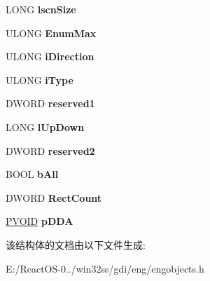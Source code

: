 \begin{DoxyCompactItemize}
\mbox{\label{struct___x_c_l_i_p_o_b_j_a49493395b035c31a73e59db873da0da6}} 
L\+O\+NG {\bfseries lscn\+Size}
\item 
\mbox{\label{struct___x_c_l_i_p_o_b_j_a582917e3993dc69ce7d884c406a0ebb5}} 
U\+L\+O\+NG {\bfseries Enum\+Max}
\item 
\mbox{\label{struct___x_c_l_i_p_o_b_j_a2e4ce570360881ee1650d0316d4ea4b3}} 
U\+L\+O\+NG {\bfseries i\+Direction}
\item 
\mbox{\label{struct___x_c_l_i_p_o_b_j_a838a00edbb482f46961d80a93dc7008d}} 
U\+L\+O\+NG {\bfseries i\+Type}
\item 
\mbox{\label{struct___x_c_l_i_p_o_b_j_a557cde0c91dd7812eda1de7ae44ac2e0}} 
D\+W\+O\+RD {\bfseries reserved1}
\item 
\mbox{\label{struct___x_c_l_i_p_o_b_j_a6e479431197bd32947875d264f6cf809}} 
L\+O\+NG {\bfseries l\+Up\+Down}
\item 
\mbox{\label{struct___x_c_l_i_p_o_b_j_a089ccc7b62b11f8ea11c5bfb51e45337}} 
D\+W\+O\+RD {\bfseries reserved2}
\item 
\mbox{\label{struct___x_c_l_i_p_o_b_j_aae66fb68f2aad714139d556ffc50ad6e}} 
B\+O\+OL {\bfseries b\+All}
\item 
\mbox{\label{struct___x_c_l_i_p_o_b_j_ac3034eb7bddc2dc9aa53334092ba8343}} 
D\+W\+O\+RD {\bfseries Rect\+Count}
\item 
\mbox{\label{struct___x_c_l_i_p_o_b_j_a64697e62e32dca47e928c755f5720460}} 
\hyperlink{interfacevoid}{P\+V\+O\+ID} {\bfseries p\+D\+DA}
\end{DoxyCompactItemize}


该结构体的文档由以下文件生成\+:\begin{DoxyCompactItemize}
\item 
E\+:/\+React\+O\+S-\/0../win32ss/gdi/eng/engobjects.\+h\end{DoxyCompactItemize}
